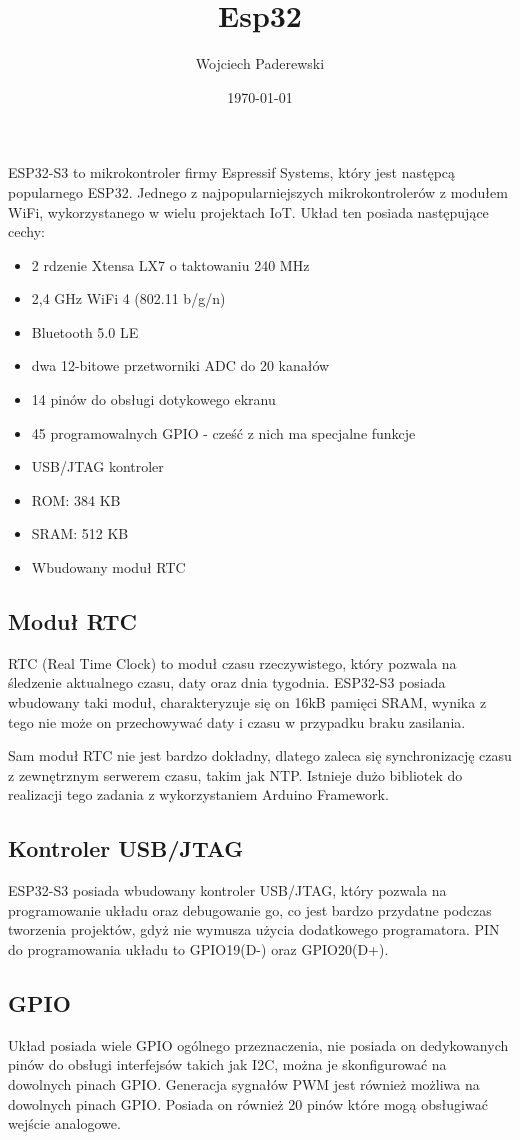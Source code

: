 \documentclass[../main.tex]{subfiles}
\author{Wojciech Paderewski}
\date{\today}
\title{Esp32}
\begin{document}
ESP32-S3 to mikrokontroler firmy Espressif Systems, który jest następcą popularnego ESP32.
Jednego z najpopularniejszych mikrokontrolerów z modułem WiFi, wykorzystanego w wielu projektach IoT.
Układ ten posiada następujące cechy:

\begin{itemize}
\item 2 rdzenie Xtensa LX7 o taktowaniu 240 MHz
\item 2,4 GHz WiFi 4 (802.11 b/g/n)
\item Bluetooth 5.0 LE
\item dwa 12-bitowe przetworniki ADC do 20 kanałów
\item 14 pinów do obsługi dotykowego ekranu
\item 45 programowalnych GPIO - cześć z nich ma specjalne funkcje
\item USB/JTAG kontroler
\item ROM: 384 KB
\item SRAM: 512 KB
\item Wbudowany moduł RTC
\end{itemize}
\subsection{Moduł RTC}

RTC (Real Time Clock) to moduł czasu rzeczywistego, który pozwala na śledzenie aktualnego czasu, daty oraz dnia tygodnia. 
ESP32-S3 posiada wbudowany taki moduł, charakteryzuje się on 16kB pamięci SRAM, wynika z tego nie może on przechowywać daty i czasu w przypadku braku zasilania.

Sam moduł RTC nie jest bardzo dokładny, dlatego zaleca się synchronizację czasu z zewnętrznym serwerem czasu, takim jak NTP.
Istnieje dużo bibliotek do realizacji tego zadania z wykorzystaniem Arduino Framework.

\subsection{Kontroler USB/JTAG}
ESP32-S3 posiada wbudowany kontroler USB/JTAG, który pozwala na programowanie układu oraz debugowanie go, co jest bardzo przydatne podczas tworzenia projektów,
gdyż nie wymusza użycia dodatkowego programatora. PIN do programowania układu to GPIO19(D-) oraz GPIO20(D+).

\subsection{GPIO}
Układ posiada wiele GPIO ogólnego przeznaczenia, nie posiada on dedykowanych pinów do obsługi interfejsów takich jak I2C, można 
je skonfigurować na dowolnych pinach GPIO. Generacja sygnałów PWM jest również możliwa na dowolnych pinach GPIO. Posiada on również 20 pinów które mogą
obsługiwać wejście analogowe.
\end{document}
